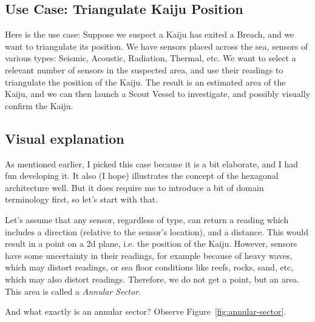\subsection{Use Case: Triangulate Kaiju Position}

Here is the use case: Suppose we suspect a Kaiju has exited a Breach, and we want to triangulate its position. We have sensors placed across the sea, sensors of various types: Seismic, Acoustic, Radiation, Thermal, etc. We want to select a relevant number of sensors in the suspected area, and use their readings to triangulate the position of the Kaiju. The result is an estimated area of the Kaiju, and we can then launch a Scout Vessel to investigate, and possibly visually confirm the Kaiju.

\subsection{Visual explanation}

As mentioned earlier, I picked this case because it is a bit elaborate, and I had fun developing it. It also (I hope) illustrates the concept of the hexagonal architecture well. But it does require me to introduce a bit of domain terminology first, so let's start with that.

Let's assume that any sensor, regardless of type, can return a reading which includes a direction (relative to the sensor's location), and a distance. This would result in a point on a 2d plane, i.e. the position of the Kaiju. However, sensors have some uncertainty in their readings, for example because of heavy waves, which may distort readings, or sea floor conditions like reefs, rocks, sand, etc, which may also distort readings. Therefore, we do not get a point, but an area. This area is called a \textit{Annular Sector}.

And what exactly is an annular sector? Observe Figure~\ref{fig:annular-sector}.

